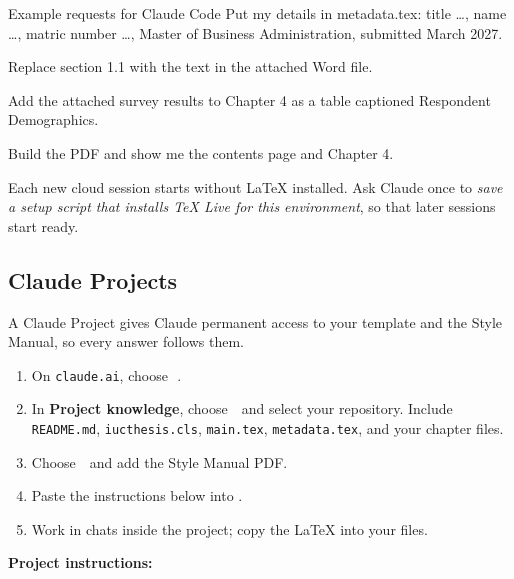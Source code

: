 \documentclass[11pt,a4paper]{article}
\newcommand\file[1]{\texttt{#1}}
\newcommand\then{\,\textrightarrow\,}
\begin{document}
\begin{promptbox}{Example requests for Claude Code}
Put my details in metadata.tex: title \ldots, name \ldots, matric number \ldots,
Master of Business Administration, submitted March 2027.\par
Replace section 1.1 with the text in the attached Word file.\par
Add the attached survey results to Chapter 4 as a table captioned
Respondent Demographics.\par
Build the PDF and show me the contents page and Chapter 4.
\end{promptbox}

Each new cloud session starts without LaTeX installed. Ask Claude once to
\emph{save a setup script that installs TeX Live for this environment}, so that
later sessions start ready.

\subsection{Claude Projects}

A Claude Project gives Claude permanent access to your template and the Style
Manual, so every answer follows them.

\begin{enumerate}
  \item On \texttt{claude.ai}, choose \then{}.
  \item In \textbf{Project knowledge}, choose \ui{+}\then{} and select
        your repository. Include \file{README.md}, \file{iucthesis.cls},
        \file{main.tex}, \file{metadata.tex}, and your chapter files.
  \item Choose \ui{+}\then{} and add the Style Manual PDF.
  \item Paste the instructions below into .
  \item Work in chats inside the project; copy the LaTeX into your files.
\end{enumerate}

\textbf{Project instructions:}
\end{document}
